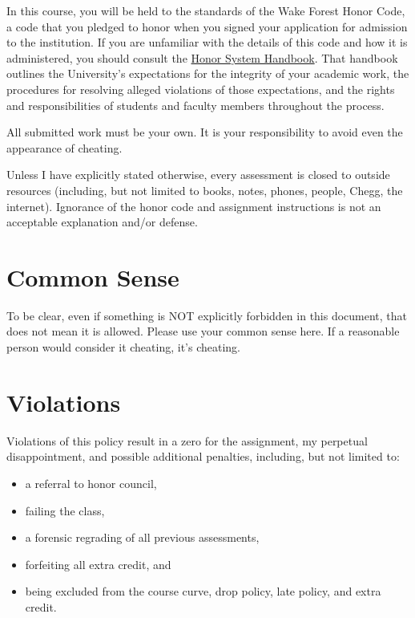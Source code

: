 In this course, you will be held to the standards of the Wake Forest Honor Code, a code that you pledged to honor when you signed your application for admission to the institution.
If you are unfamiliar with the details of this code and how it is administered, you should consult the \href{https://studentconduct.wfu.edu/honor-system-wfu/}{Honor System Handbook}.
That handbook outlines the University's expectations for the integrity of your academic work, the procedures for resolving alleged violations of those expectations, and the rights and responsibilities of students and faculty members throughout the process.

All submitted work must be your own. It is your responsibility to avoid even the appearance of cheating.

Unless I have explicitly stated otherwise, every assessment is closed to outside resources (including, but not limited to books, notes, phones, people, Chegg, the internet).
Ignorance of the honor code and assignment instructions is not an acceptable explanation and/or defense.

\hypertarget{common-sense}{%
\section{Common Sense}\label{common-sense}}

To be clear, even if something is NOT explicitly forbidden in this document, that does not mean it is allowed. Please use your common sense here. If a reasonable person would consider it cheating, it's cheating.

\hypertarget{violations}{%
\section{Violations}\label{violations}}

Violations of this policy result in a zero for the assignment, my perpetual disappointment, and possible additional penalties, including, but not limited to:

\begin{itemize}
\tightlist
\item
  a referral to honor council,
\item
  failing the class,
\item
  a forensic regrading of all previous assessments,
\item
  forfeiting all extra credit, and
\item
  being excluded from the course curve, drop policy, late policy, and extra credit.
\end{itemize}

